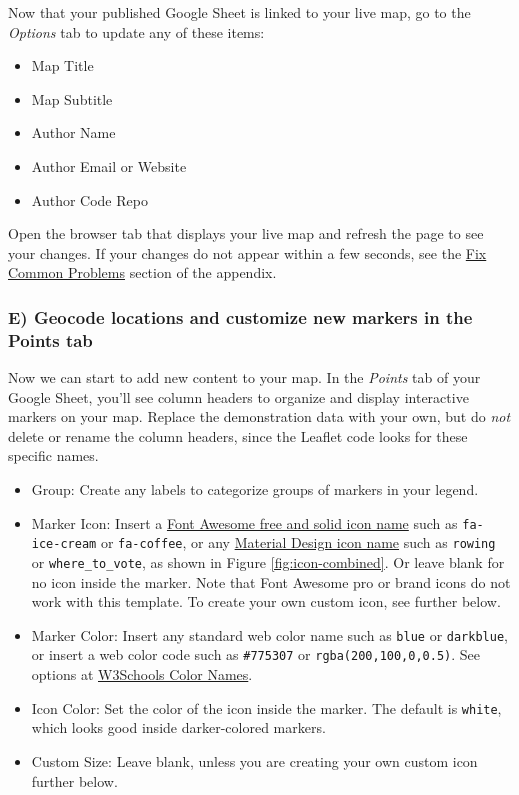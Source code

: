 \documentclass[
  english,
]{book}
\providecommand{\tightlist}{%
  \setlength{\itemsep}{0pt}\setlength{\parskip}{0pt}}
\begin{document}
Now that your published Google Sheet is linked to your live map, go to the \emph{Options} tab to update any of these items:

\begin{itemize}
\tightlist
\item
  Map Title
\item
  Map Subtitle
\item
  Author Name
\item
  Author Email or Website
\item
  Author Code Repo
\end{itemize}

Open the browser tab that displays your live map and refresh the page to see your changes. If your changes do not appear within a few seconds, see the \href{fix.html}{Fix Common Problems} section of the appendix.

\hypertarget{e-geocode-locations-and-customize-new-markers-in-the-points-tab}{%
\subsubsection*{E) Geocode locations and customize new markers in the Points tab}\label{e-geocode-locations-and-customize-new-markers-in-the-points-tab}}

Now we can start to add new content to your map. In the \emph{Points} tab of your Google Sheet, you'll see column headers to organize and display interactive markers on your map. Replace the demonstration data with your own, but do \emph{not} delete or rename the column headers, since the Leaflet code looks for these specific names.

\begin{itemize}
\tightlist
\item
  Group: Create any labels to categorize groups of markers in your legend.
\item
  Marker Icon: Insert a \href{https://fontawesome.com/icons?d=gallery\&s=solid\&m=free}{Font Awesome free and solid icon name} such as \texttt{fa-ice-cream} or \texttt{fa-coffee}, or any \href{https://material.io/resources/icons/?style=baseline}{Material Design icon name} such as \texttt{rowing} or \texttt{where\_to\_vote}, as shown in Figure \ref{fig:icon-combined}. Or leave blank for no icon inside the marker. Note that Font Awesome pro or brand icons do not work with this template. To create your own custom icon, see further below.
\item
  Marker Color: Insert any standard web color name such as \texttt{blue} or \texttt{darkblue}, or insert a web color code such as \texttt{\#775307} or \texttt{rgba(200,100,0,0.5)}. See options at \href{https://www.w3schools.com/colors/colors_names.asp}{W3Schools Color Names}.
\item
  Icon Color: Set the color of the icon inside the marker. The default is \texttt{white}, which looks good inside darker-colored markers.
\item
  Custom Size: Leave blank, unless you are creating your own custom icon further below.
\end{itemize}
\end{document}
